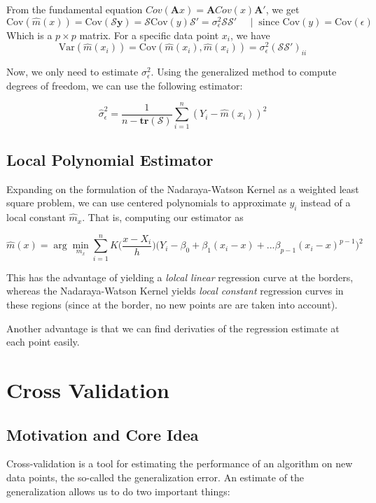 \documentclass[]{book}
\begin{document}
From the fundamental equation
\(Cov(\mathbf{A}x) = \mathbf{A} Cov(x) \mathbf{A}'\), we get
\[ \text{Cov}(\hat{m}(x)) = \text{Cov}(\mathcal{S}\mathbf{y}) = 
\mathcal{S} \text{Cov}(y) \mathcal{S}' = \sigma_\epsilon^2\mathcal{SS}'
\;\;\;\;\;|\;\; \text{since Cov}(y) = \text{Cov}(\epsilon)\] Which is a
\(p\times p\) matrix. For a specific data point \(x_i\), we have
\[ \text{Var}(\hat{m}(x_i))= \text{Cov}(\hat{m}(x_i),  \hat{m}(x_i)) = \sigma_\epsilon^2 (\mathcal{S} \mathcal{S}')_{ii} \]

Now, we only need to estimate \(\sigma^2_\epsilon\). Using the
generalized method to compute degrees of freedom, we can use the
following estimator:

\[ \hat{\sigma}_\epsilon^2 = \frac{1}{n-\textbf{tr}(\mathcal{S})}
\sum\limits_{i = 1}^n (Y_i - \hat{m}(x_i))^2\]

\section{Local Polynomial Estimator}\label{local-polynomial-estimator-1}

Expanding on the formulation of the Nadaraya-Watson Kernel as a weighted
least square problem, we can use centered polynomials to approximate
\(y_i\) instead of a local constant \(\hat{m}_x\). That is, computing
our estimator as

\[\hat{m}(x) = \arg\min\limits_{m_x} \sum\limits_{i = 1}^nK\Big(\frac{x-X_i}{h}\Big)
\big(Y_i-\beta_0 + \beta_1 (x_i -x) + ... \beta_{p-1} (x_i-x)^{p-1}\big)^2 \]

This has the advantage of yielding a \emph{lolcal linear} regression
curve at the borders, whereas the Nadaraya-Watson Kernel yields
\emph{local constant} regression curves in these regions (since at the
border, no new points are are taken into account).

Another advantage is that we can find derivaties of the regression
estimate at each point easily.

\chapter{Cross Validation}\label{cross-validation}

\section{Motivation and Core Idea}\label{motivation-and-core-idea}

Cross-validation is a tool for estimating the performance of an
algorithm on new data points, the so-called the generalization error. An
estimate of the generalization allows us to do two important things:
\end{document}
